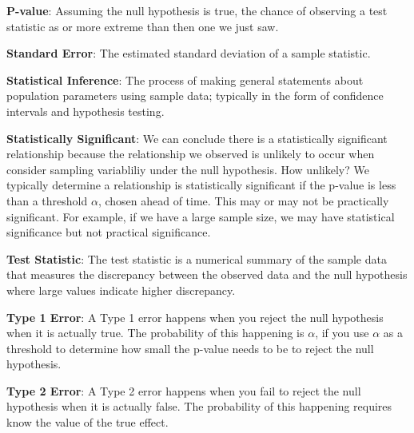 \documentclass[]{book}
\begin{document}
\textbf{P-value}: Assuming the null hypothesis is true, the chance of observing a test statistic as or more extreme than then one we just saw.

\textbf{Standard Error}: The estimated standard deviation of a sample statistic.

\textbf{Statistical Inference}: The process of making general statements about population parameters using sample data; typically in the form of confidence intervals and hypothesis testing.

\textbf{Statistically Significant}: We can conclude there is a statistically significant relationship because the relationship we observed is unlikely to occur when consider sampling variabliliy under the null hypothesis. How unlikely? We typically determine a relationship is statistically significant if the p-value is less than a threshold \(\alpha\), chosen ahead of time. This may or may not be practically significant. For example, if we have a large sample size, we may have statistical significance but not practical significance.

\textbf{Test Statistic}: The test statistic is a numerical summary of the sample data that measures the discrepancy between the observed data and the null hypothesis where large values indicate higher discrepancy.

\textbf{Type 1 Error}: A Type 1 error happens when you reject the null hypothesis when it is actually true. The probability of this happening is \(\alpha\), if you use \(\alpha\) as a threshold to determine how small the p-value needs to be to reject the null hypothesis.

\textbf{Type 2 Error}: A Type 2 error happens when you fail to reject the null hypothesis when it is actually false. The probability of this happening requires know the value of the true effect.
\end{document}
